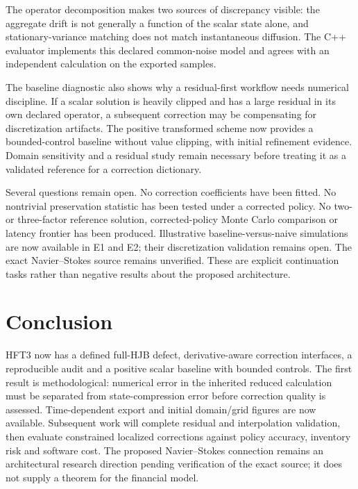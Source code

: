 The operator decomposition makes two sources of discrepancy visible: the aggregate drift is not generally a function of the scalar state alone, and stationary-variance matching does not match instantaneous diffusion. The C++ evaluator implements this declared common-noise model and agrees with an independent calculation on the exported samples.

The baseline diagnostic also shows why a residual-first workflow needs numerical discipline. If a scalar solution is heavily clipped and has a large residual in its own declared operator, a subsequent correction may be compensating for discretization artifacts. The positive transformed scheme now provides a bounded-control baseline without value clipping, with initial refinement evidence. Domain sensitivity and a residual study remain necessary before treating it as a validated reference for a correction dictionary.

Several questions remain open. No correction coefficients have been fitted. No nontrivial preservation statistic has been tested under a corrected policy. No two- or three-factor reference solution, corrected-policy Monte Carlo comparison or latency frontier has been produced. Illustrative baseline-versus-naive simulations are now available in E1 and E2; their discretization validation remains open. The exact Navier--Stokes source remains unverified. These are explicit continuation tasks rather than negative results about the proposed architecture.

\chapter*{Conclusion}
HFT3 now has a defined full-HJB defect, derivative-aware correction interfaces, a reproducible audit and a positive scalar baseline with bounded controls. The first result is methodological: numerical error in the inherited reduced calculation must be separated from state-compression error before correction quality is assessed. Time-dependent export and initial domain/grid figures are now available. Subsequent work will complete residual and interpolation validation, then evaluate constrained localized corrections against policy accuracy, inventory risk and software cost. The proposed Navier--Stokes connection remains an architectural research direction pending verification of the exact source; it does not supply a theorem for the financial model.

